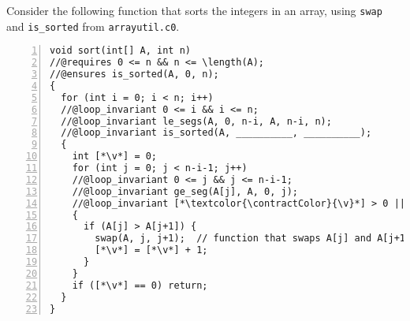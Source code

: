 \clearpage
{}
\bgroup
\renewcommand{\v}  %
{k}

Consider the following function that sorts the integers in an array, using
\lstinline'swap' and \lstinline'is_sorted' from \lstinline'arrayutil.c0'.

\begin{lstlisting}[numbers=left]
void sort(int[] A, int n)
//@requires 0 <= n && n <= \length(A);
//@ensures is_sorted(A, 0, n);
{
  for (int i = 0; i < n; i++)
  //@loop_invariant 0 <= i && i <= n;
  //@loop_invariant le_segs(A, 0, n-i, A, n-i, n);
  //@loop_invariant is_sorted(A, __________, __________);
  {
    int [*\v*] = 0;
    for (int j = 0; j < n-i-1; j++)
    //@loop_invariant 0 <= j && j <= n-i-1;
    //@loop_invariant ge_seg(A[j], A, 0, j);
    //@loop_invariant [*\textcolor{\contractColor}{\v}*] > 0 || ([*\textcolor{\contractColor}{\v}*] == 0 && is_sorted(A, 0, j));
    {
      if (A[j] > A[j+1]) {
        swap(A, j, j+1);  // function that swaps A[j] and A[j+1]
        [*\v*] = [*\v*] + 1;
      }
    }
    if ([*\v*] == 0) return;
  }
}
\end{lstlisting}


